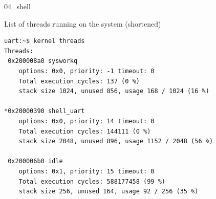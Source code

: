 \documentclass[10pt, aspectratio=169]{beamer}
\begin{document}
\begin{frame}[fragile]{04\_shell}

\begin{exampleblock}{List of threads running on the system (shortened)}

    {\fontsize{7}{9.6}\selectfont
      \begin{verbatim}
uart:~$ kernel threads 
Threads:
 0x200008a0 sysworkq  
	options: 0x0, priority: -1 timeout: 0
	Total execution cycles: 137 (0 %)
	stack size 1024, unused 856, usage 168 / 1024 (16 %)

*0x20000390 shell_uart
	options: 0x0, priority: 14 timeout: 0
	Total execution cycles: 144111 (0 %)
	stack size 2048, unused 896, usage 1152 / 2048 (56 %)

 0x200006b0 idle      
	options: 0x1, priority: 15 timeout: 0
	Total execution cycles: 588177458 (99 %)
	stack size 256, unused 164, usage 92 / 256 (35 %)
      \end{verbatim}
    }
  \end{exampleblock}

\end{frame}
\end{document}
